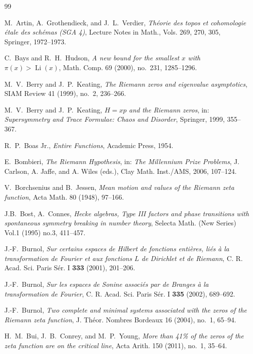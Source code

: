 \documentclass{article}
\begin{document}
\begin{thebibliography}{99}

M.~Artin, A.~Grothendieck, and J.~L.~Verdier, 
\emph{Théorie des topos et cohomologie étale des schémas (SGA 4)}, 
Lecture Notes in Math., Vols. 269, 270, 305, Springer, 1972--1973.

C.~Bays and R.~H.~Hudson, 
\emph{A new bound for the smallest $x$ with $\pi(x) > \operatorname{Li}(x)$}, 
Math. Comp. 69 (2000), no.~231, 1285--1296.

M.~V.~Berry and J.~P.~Keating, 
\emph{The Riemann zeros and eigenvalue asymptotics}, 
SIAM Review 41 (1999), no.~2, 236--266.

M.~V.~Berry and J.~P.~Keating, 
\emph{$H = xp$ and the Riemann zeros}, 
in: \emph{Supersymmetry and Trace Formulae: Chaos and Disorder}, 
Springer, 1999, 355--367.

R.~P.~Boas Jr., 
\emph{Entire Functions}, Academic Press, 1954.

E.~Bombieri, 
\emph{The Riemann Hypothesis}, in: \emph{The Millennium Prize Problems}, 
J. Carlson, A. Jaffe, and A. Wiles (eds.), Clay Math. Inst./AMS, 2006, 107--124.

V.~Borchsenius and B.~Jessen, 
\emph{Mean motion and values of the Riemann zeta function}, 
Acta Math. 80 (1948), 97--166.

 J.B.~Bost, A.~Connes, {\em Hecke algebras, Type III
factors and phase transitions with spontaneous symmetry breaking in
number theory}, Selecta Math. (New Series) Vol.1 (1995) no.3,
411--457.

J.-F.~Burnol, 
\emph{Sur certains espaces de Hilbert de fonctions entières, liés à la transformation de Fourier et aux fonctions $L$ de Dirichlet et de Riemann}, 
C. R. Acad. Sci. Paris Sér. I \textbf{333} (2001), 201--206.

J.-F.~Burnol, 
\emph{Sur les espaces de Sonine associés par de Branges à la transformation de Fourier}, 
C. R. Acad. Sci. Paris Sér. I \textbf{335} (2002), 689--692.

J.-F.~Burnol, 
\emph{Two complete and minimal systems associated with the zeros of the Riemann zeta function}, 
J. Théor. Nombres Bordeaux 16 (2004), no.~1, 65--94.

H.~M.~Bui, J.~B.~Conrey, and M.~P.~Young, 
\emph{More than 41\% of the zeros of the zeta function are on the critical line}, 
Acta Arith. 150 (2011), no.~1, 35--64.


\end{thebibliography}
\end{document}
